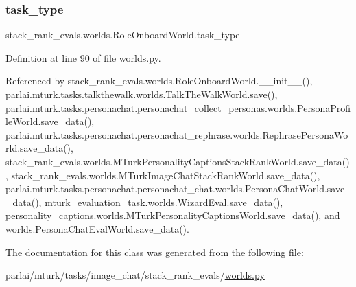 \subsubsection{\texorpdfstring{task\+\_\+type}{task\_type}}
{\footnotesize\ttfamily stack\+\_\+rank\+\_\+evals.\+worlds.\+Role\+Onboard\+World.\+task\+\_\+type}



Definition at line 90 of file worlds.\+py.



Referenced by stack\+\_\+rank\+\_\+evals.\+worlds.\+Role\+Onboard\+World.\+\_\+\+\_\+init\+\_\+\+\_\+(), parlai.\+mturk.\+tasks.\+talkthewalk.\+worlds.\+Talk\+The\+Walk\+World.\+save(), parlai.\+mturk.\+tasks.\+personachat.\+personachat\+\_\+collect\+\_\+personas.\+worlds.\+Persona\+Profile\+World.\+save\+\_\+data(), parlai.\+mturk.\+tasks.\+personachat.\+personachat\+\_\+rephrase.\+worlds.\+Rephrase\+Persona\+World.\+save\+\_\+data(), stack\+\_\+rank\+\_\+evals.\+worlds.\+M\+Turk\+Personality\+Captions\+Stack\+Rank\+World.\+save\+\_\+data(), stack\+\_\+rank\+\_\+evals.\+worlds.\+M\+Turk\+Image\+Chat\+Stack\+Rank\+World.\+save\+\_\+data(), parlai.\+mturk.\+tasks.\+personachat.\+personachat\+\_\+chat.\+worlds.\+Persona\+Chat\+World.\+save\+\_\+data(), mturk\+\_\+evaluation\+\_\+task.\+worlds.\+Wizard\+Eval.\+save\+\_\+data(), personality\+\_\+captions.\+worlds.\+M\+Turk\+Personality\+Captions\+World.\+save\+\_\+data(), and worlds.\+Persona\+Chat\+Eval\+World.\+save\+\_\+data().



The documentation for this class was generated from the following file\+:\begin{DoxyCompactItemize}
\item 
parlai/mturk/tasks/image\+\_\+chat/stack\+\_\+rank\+\_\+evals/\hyperlink{parlai_2mturk_2tasks_2image__chat_2stack__rank__evals_2worlds_8py}{worlds.\+py}\end{DoxyCompactItemize}
